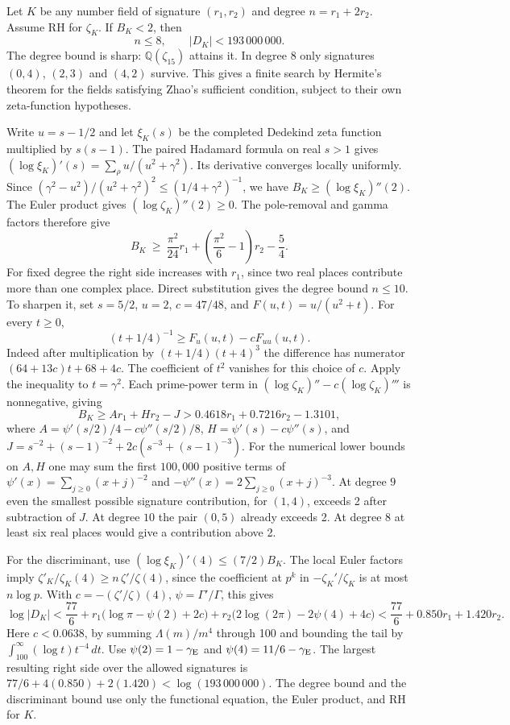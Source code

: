 \documentclass[11pt]{article}
\begin{document}
Let $K$ be any number field of signature $(r_1,r_2)$ and degree $n=r_1+2r_2$.
Assume RH for $\zeta_K$. If $B_K<2$, then
\[
 n\le 8,\qquad |D_K|<193\,000\,000.
\]
The degree bound is sharp: $\mathbb Q(\zeta_{15})$ attains it. In degree 8 only signatures $(0,4)$, $(2,3)$ and $(4,2)$ survive.
This gives a finite search by Hermite's theorem for the fields satisfying
Zhao's sufficient condition, subject to their own zeta-function hypotheses.

Write $u=s-1/2$ and let $\xi_K(s)$ be the completed Dedekind zeta function
multiplied by $s(s-1)$. The paired Hadamard formula on real $s>1$ gives
$(\log\xi_K)'(s)=\sum_\rho u/(u^2+\gamma^2)$. Its derivative converges
locally uniformly. Since
$(\gamma^2-u^2)/(u^2+\gamma^2)^2\le(1/4+\gamma^2)^{-1}$,
we have $B_K\ge(\log\xi_K)''(2)$. The Euler product gives
$(\log\zeta_K)''(2)\ge0$. The pole-removal and gamma factors therefore give
\[
 B_K\ \ge\ \frac{\pi^2}{24}r_1+
       \left(\frac{\pi^2}{6}-1\right)r_2-\frac54 .
\]
For fixed degree the right side increases with $r_1$, since two real places
contribute more than one complex place. Direct substitution gives the degree
bound $n\le10$. To sharpen it, set $s=5/2$, $u=2$, $c=47/48$, and
$F(u,t)=u/(u^2+t)$. For every $t\ge0$,
\[
    (t+1/4)^{-1}\ge F_u(u,t)-cF_{uu}(u,t).
\]
Indeed after multiplication by $(t+1/4)(t+4)^3$ the difference has
numerator $(64+13c)t+68+4c$. The coefficient of $t^2$ vanishes for
this choice of $c$. Apply the inequality to $t=\gamma^2$. Each prime-power
term in $(\log\zeta_K)''-c(\log\zeta_K)'''$ is nonnegative, giving
\[
 B_K\ge Ar_1+Hr_2-J>0.4618 r_1+0.7216r_2-1.3101 ,
\]
where $A=\psi'(s/2)/4-c\psi''(s/2)/8$,
$H=\psi'(s)-c\psi''(s)$, and
$J=s^{-2}+(s-1)^{-2}+2c(s^{-3}+(s-1)^{-3})$.
For the numerical lower bounds on $A,H$ one may sum the first $100{,}000$
positive terms of $\psi'(x)=\sum_{j\ge0}(x+j)^{-2}$ and
$-\psi''(x)=2\sum_{j\ge0}(x+j)^{-3}$. At degree $9$ even the smallest
possible signature contribution, for $(1,4)$, exceeds 2 after subtraction
of $J$. At degree $10$ the pair $(0,5)$ already exceeds 2.
At degree $8$ at least six real places would give a contribution above 2.

For the discriminant, use $(\log\xi_K)'(4)\le(7/2)B_K$. The local Euler
factors imply $\zeta'_K/\zeta_K(4)\ge n\,\zeta'/\zeta(4)$, since the
coefficient at $p^k$ in $-\zeta_K'/\zeta_K$ is at most $n\log p$.
With $c=-(\zeta'/\zeta)(4)$, $\psi=\Gamma'/\Gamma$, this gives
\[
 \log |D_K|<\frac{77}{6}
 +r_1\bigl(\log\pi-\psi(2)+2c\bigr)
 +r_2\bigl(2\log(2\pi)-2\psi(4)+4c\bigr)
 <\frac{77}{6}+0.850r_1+1.420r_2 .
\]
Here $c<0.0638$, by summing $\Lambda(m)/m^4$ through 100 and bounding
the tail by $\int_{100}^\infty (\log t)t^{-4}\,dt$.
Use $\psi(2)=1-\gamma_{\rm E}$ and $\psi(4)=11/6-\gamma_{\rm E}$.
The largest resulting right side over the allowed signatures is
$77/6+4(0.850)+2(1.420)<\log(193\,000\,000)$. The degree bound and the discriminant
bound use only the functional equation, the Euler product, and RH for $K$.
\end{document}
